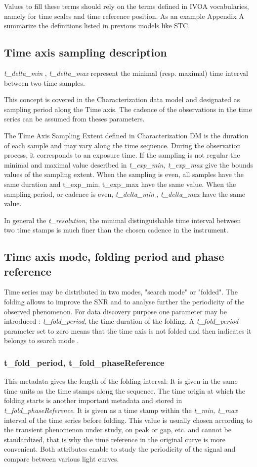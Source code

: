 \documentclass[11pt,a4paper]{ivoa}
\begin{document}
 
Values to fill these terms should rely on the terms defined in IVOA vocabularies, namely for  time scales and time reference position. 
As an example Appendix A summarize the definitions listed in previous models like STC.
 
\subsection{Time axis sampling description}
\emph{t\_delta\_min }, \emph{t\_delta\_max}  represent the minimal (resp. maximal) time interval between two time samples.

This concept is covered in the Characterization data model \citep{2008ivoa.spec.0325L} and designated as sampling period along the Time axis. 
The cadence of the observations in the time series  can be assumed from theses parameters. 
 
 The Time Axis Sampling Extent defined in Characterization DM is the duration of each sample and may vary along the time sequence. 
 During the observation process, it corresponds to an exposure time. 
 If the sampling is not regular the minimal and maximal value described in \emph{ t\_exp\_min, t\_exp\_max} give the bounds values of the sampling extent. 
When the sampling  is even, all samples have the same duration and  t\_exp\_min, t\_exp\_max have the same value. 
When the sampling period, or cadence  is even, \emph{t\_delta\_min }, \emph{t\_delta\_max} have the same value. 

In general the \emph{t\_resolution}, the minimal distinguishable time interval between two time stamps is  much finer than the chosen cadence in the instrument.  %

\subsection{Time axis mode, folding period  and phase reference}
Time series may be distributed in two modes, "search mode" or "folded". 
The folding allows to improve the SNR and to analyse further the periodicity of the observed phenomenon.
For data discovery  purpose one parameter may be introduced : \emph{t\_fold\_period}, the time duration of the folding.
A \emph{t\_fold\_period} parameter set to zero means that the time axis is not folded  and then indicates it belongs to search mode .

\subsubsection{ t\_fold\_period,  t\_fold\_phaseReference}
This metadata gives the length  of the folding interval. It is given in the same time units as the time stamps along the sequence. 
The time origin at which the folding starts is another important metadata and stored in 
\emph{t\_fold\_phaseReference}. It is given as a time stamp within the \emph{t\_min, t\_max} interval of the time series before folding.
This value is usually chosen according to the transient phenomenon under study, on peak or gap, etc.  and cannot be standardized, that is why the time reference in the original curve is more convenient. 
Both attributes enable to study the periodicity of the signal and compare between various light curves.
\end{document}
